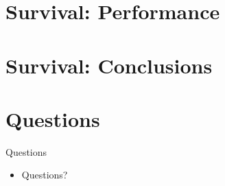 \documentclass{beamer}
\begin{document}
\section{Survival: Performance}
\begin{frame}
  
  
\end{frame}

\section{Survival: Conclusions}
\begin{frame}
  
\end{frame}

\section{Questions}
\begin{frame}
  
  {\Huge Questions}
  \begin{itemize}
  \item Questions?
  \end{itemize}

\end{frame}
\end{document}
